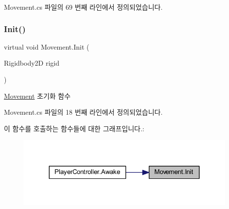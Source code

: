 Movement.\+cs 파일의 69 번째 라인에서 정의되었습니다.


\begin{DoxyCode}{0}

\end{DoxyCode}
\mbox{\label{class_movement_a1c50c07edbe274e1cf55253e87506684}} 
\subsubsection{\texorpdfstring{Init()}{Init()}}
{\footnotesize\ttfamily virtual void Movement.\+Init (\begin{DoxyParamCaption}\item[{Rigidbody2D}]{rigid }\end{DoxyParamCaption})\hspace{0.3cm}{\ttfamily [virtual]}}



\mbox{\hyperlink{class_movement}{Movement}} 초기화 함수 



Movement.\+cs 파일의 18 번째 라인에서 정의되었습니다.


\begin{DoxyCode}{0}

\end{DoxyCode}
이 함수를 호출하는 함수들에 대한 그래프입니다.\+:
\nopagebreak
\begin{figure}[H]
\begin{center}
\leavevmode
\includegraphics[width=311pt]{d1/de2/class_movement_a1c50c07edbe274e1cf55253e87506684_icgraph}
\end{center}
\end{figure}
\mbox{\label{class_movement_a561e8f643a3f3cd6b0b6789c72161e98}} 
